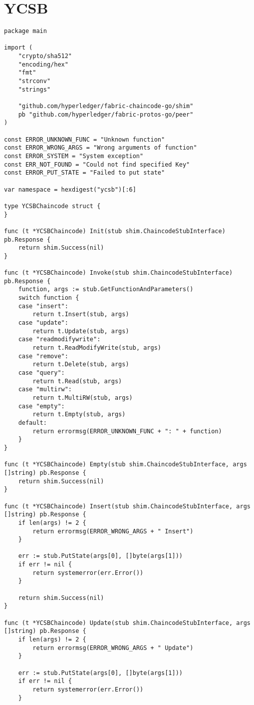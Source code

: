 \section{YCSB}
\label{ch:append:contracts:ycsb}
\begin{lstlisting}
package main

import (
	"crypto/sha512"
	"encoding/hex"
	"fmt"
	"strconv"
	"strings"

	"github.com/hyperledger/fabric-chaincode-go/shim"
    pb "github.com/hyperledger/fabric-protos-go/peer"
)

const ERROR_UNKNOWN_FUNC = "Unknown function"
const ERROR_WRONG_ARGS = "Wrong arguments of function"
const ERROR_SYSTEM = "System exception"
const ERR_NOT_FOUND = "Could not find specified Key"
const ERROR_PUT_STATE = "Failed to put state"

var namespace = hexdigest("ycsb")[:6]

type YCSBChaincode struct {
}

func (t *YCSBChaincode) Init(stub shim.ChaincodeStubInterface) pb.Response {
	return shim.Success(nil)
}

func (t *YCSBChaincode) Invoke(stub shim.ChaincodeStubInterface) pb.Response {
	function, args := stub.GetFunctionAndParameters()
	switch function {
	case "insert":
		return t.Insert(stub, args)
	case "update":
		return t.Update(stub, args)
	case "readmodifywrite":
		return t.ReadModifyWrite(stub, args)
	case "remove":
		return t.Delete(stub, args)
	case "query":
		return t.Read(stub, args)
	case "multirw":
		return t.MultiRW(stub, args)
	case "empty":
		return t.Empty(stub, args)
	default:
		return errormsg(ERROR_UNKNOWN_FUNC + ": " + function)
	}
}

func (t *YCSBChaincode) Empty(stub shim.ChaincodeStubInterface, args []string) pb.Response {
	return shim.Success(nil)
}

func (t *YCSBChaincode) Insert(stub shim.ChaincodeStubInterface, args []string) pb.Response {
	if len(args) != 2 { 
		return errormsg(ERROR_WRONG_ARGS + " Insert")
	}

	err := stub.PutState(args[0], []byte(args[1]))
	if err != nil {
		return systemerror(err.Error())
	}

	return shim.Success(nil)
}

func (t *YCSBChaincode) Update(stub shim.ChaincodeStubInterface, args []string) pb.Response {
	if len(args) != 2 { 
		return errormsg(ERROR_WRONG_ARGS + " Update")
	}

	err := stub.PutState(args[0], []byte(args[1]))
	if err != nil {
		return systemerror(err.Error())
	}


\end{lstlisting}
